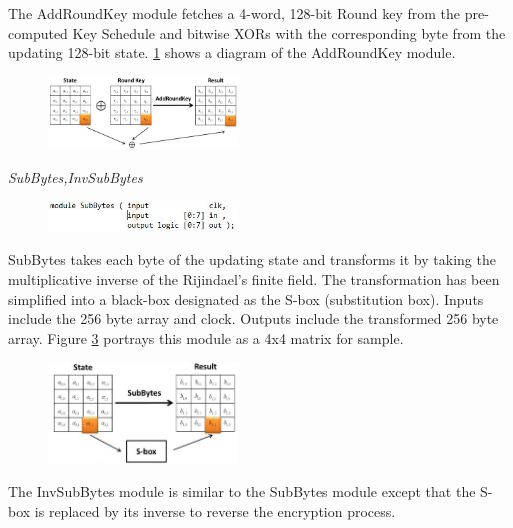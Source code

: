 \documentclass[journal, twocolumn, final,11pt,letterpaper]{IEEEtran}
\begin{document}
The AddRoundKey module fetches a 4-word, 128-bit Round key from the pre-computed Key Schedule and bitwise XORs with the corresponding byte from the updating 128-bit state.  \ref{fig:AddRoundKeydia} shows a diagram of the AddRoundKey module. \\

\begin{figure}[h]
	\centering
	\includegraphics[width=0.45\textwidth]{AddRoundKeydia.jpg}
	\label{fig:AddRoundKeydia}
\end{figure}  


\textit{SubBytes,InvSubBytes}\\
\vspace{-4mm}

\begin{figure}[h]
	\centering
	\includegraphics[width=0.45\textwidth]{SubBytes.jpg}
	\label{fig:SubBytes}
\end{figure}

SubBytes takes each byte of the updating state and transforms it by taking the multiplicative inverse of the Rijindael's finite field.  The transformation has been simplified into a black-box designated as the S-box (substitution box).  Inputs include the 256 byte array and clock.  Outputs include the transformed 256 byte array. Figure \ref{fig:SubBytesdia} portrays this module as a 4x4 matrix for sample.  \\

\begin{figure}[h]
	\centering
	\includegraphics[width=0.45\textwidth]{SubBytesdia.jpg}
	\label{fig:SubBytesdia}
\end{figure}

The InvSubBytes module is similar to the SubBytes module except that the S-box is replaced by its inverse to reverse the encryption process.  \\
\end{document}
